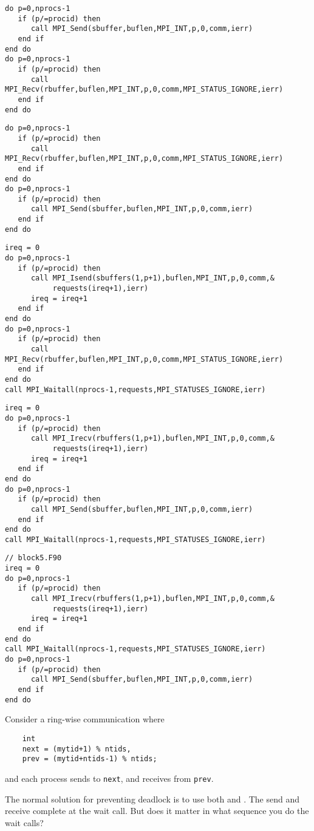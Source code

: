   \lstset{language=Fortran,basicstyle=\footnotesize\ttfamily}
\begin{lstlisting}
do p=0,nprocs-1
   if (p/=procid) then
      call MPI_Send(sbuffer,buflen,MPI_INT,p,0,comm,ierr)
   end if
end do
do p=0,nprocs-1
   if (p/=procid) then
      call MPI_Recv(rbuffer,buflen,MPI_INT,p,0,comm,MPI_STATUS_IGNORE,ierr)
   end if
end do
\end{lstlisting}
\begin{lstlisting}
do p=0,nprocs-1
   if (p/=procid) then
      call MPI_Recv(rbuffer,buflen,MPI_INT,p,0,comm,MPI_STATUS_IGNORE,ierr)
   end if
end do
do p=0,nprocs-1
   if (p/=procid) then
      call MPI_Send(sbuffer,buflen,MPI_INT,p,0,comm,ierr)
   end if
end do
\end{lstlisting}
\begin{lstlisting}
ireq = 0
do p=0,nprocs-1
   if (p/=procid) then
      call MPI_Isend(sbuffers(1,p+1),buflen,MPI_INT,p,0,comm,&
           requests(ireq+1),ierr)
      ireq = ireq+1
   end if
end do
do p=0,nprocs-1
   if (p/=procid) then
      call MPI_Recv(rbuffer,buflen,MPI_INT,p,0,comm,MPI_STATUS_IGNORE,ierr)
   end if
end do
call MPI_Waitall(nprocs-1,requests,MPI_STATUSES_IGNORE,ierr)
\end{lstlisting}
\begin{lstlisting}
ireq = 0
do p=0,nprocs-1
   if (p/=procid) then
      call MPI_Irecv(rbuffers(1,p+1),buflen,MPI_INT,p,0,comm,&
           requests(ireq+1),ierr)
      ireq = ireq+1
   end if
end do
do p=0,nprocs-1
   if (p/=procid) then
      call MPI_Send(sbuffer,buflen,MPI_INT,p,0,comm,ierr)
   end if
end do
call MPI_Waitall(nprocs-1,requests,MPI_STATUSES_IGNORE,ierr)
\end{lstlisting}
\begin{lstlisting}
// block5.F90
ireq = 0
do p=0,nprocs-1
   if (p/=procid) then
      call MPI_Irecv(rbuffers(1,p+1),buflen,MPI_INT,p,0,comm,&
           requests(ireq+1),ierr)
      ireq = ireq+1
   end if
end do
call MPI_Waitall(nprocs-1,requests,MPI_STATUSES_IGNORE,ierr)
do p=0,nprocs-1
   if (p/=procid) then
      call MPI_Send(sbuffer,buflen,MPI_INT,p,0,comm,ierr)
   end if
end do
\end{lstlisting}

\begin{review}
  Consider a ring-wise communication where
  \begin{lstlisting}
    int
    next = (mytid+1) % ntids,
    prev = (mytid+ntids-1) % ntids;
  \end{lstlisting}
  and each process sends to \lstinline{next}, and receives from \lstinline{prev}.

  The normal solution for preventing deadlock is to use both
   and . The send and
  receive complete at the wait call. But does it matter in what
  sequence you do the wait calls?
\end{review}

